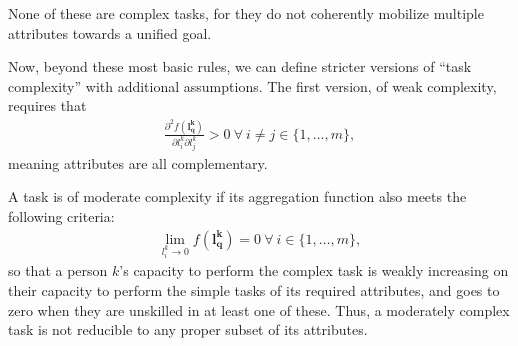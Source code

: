\documentclass[hidelinks, nonatbib]{elsarticle}
\begin{document}
\begin{definition}
    None of these are complex tasks, for they do not coherently mobilize multiple attributes towards a unified goal.
    
    \begin{subdefinition}
        Now, beyond these most basic rules, we can define stricter versions of ``task complexity'' with additional assumptions. The first version, of weak complexity, requires that
        \begin{gather}
            \frac{
                \partial ^ 2 {f(\boldsymbol{l_{q}^{k}})}
            }{
                \partial 
                l_{i}^{k}
                \partial
                l_{j}^{k}
            }
            > 0
            \
            \forall
            \
            i \neq j \in \{1, \dots, m\}
            ,
        \end{gather}
        meaning attributes are all complementary.
    \end{subdefinition}
    
    \begin{subdefinition}
        A task is of moderate complexity if its aggregation function also meets the following criteria:
        \begin{gather}
            \lim_{
                l_{i}^{k} \rightarrow 0
            }{
                f(\boldsymbol{l_{q}^{k}})
            } = 0
            \
            \forall 
            \
            i \in \{1, \dots, m\}
            ,
        \end{gather}
        so that a person $k$'s capacity to perform the complex task is weakly increasing on their capacity to perform the simple tasks of its required attributes, and goes to zero when they are unskilled in at least one of these. Thus, a moderately complex task is not reducible to any proper subset of its attributes.
        

\end{subdefinition}
\end{definition}
\end{document}
